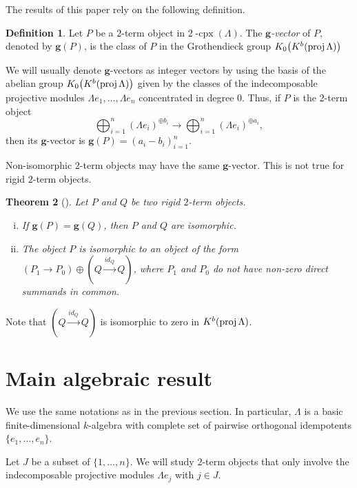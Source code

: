 \documentclass{amsart}
\newtheorem{theorem}{Theorem}%
\theoremstyle{definition}
\newtheorem{definition}[theorem]{Definition}
\renewcommand{\b}[1]{\mathbf{#1}} %
\newcommand{\darkblue}{\color{darkblue}} %
\newcommand{\defn}[1]{\textsl{\darkblue #1}} %
\newcommand{\cpx}{2 \! \operatorname{-cpx}}
\newcommand{\proj}{\operatorname{{\rm proj }}}
\begin{document}
The results of this paper rely on the following definition.

\begin{definition}
 Let $P$ be a $2$-term object in $\cpx(\Lambda)$. 
 The \defn{$\b{g}$-vector} of $P$, denoted by $\b{g}(P)$, is the class of $P$ in the Grothendieck group $K_0\big(K^b(\proj \Lambda)\big)$
\end{definition}
We will usually denote $\b{g}$-vectors as integer vectors by using the basis of the abelian group $K_0\big(K^b(\proj \Lambda)\big)$
given by the classes of the indecomposable projective modules $\Lambda e_1, \dots, \Lambda e_n$ concentrated in degree $0$.
Thus, if $P$ is the $2$-term object
\[
 \bigoplus_{i=1}^n (\Lambda e_i)^{\oplus b_i} \xrightarrow{} \bigoplus_{i=1}^n (\Lambda e_i)^{\oplus a_i},
\]
then its $\b{g}$-vector is $\b{g}(P) = (a_i - b_i)_{i=1}^n$.

Non-isomorphic $2$-term objects may have the same $\b{g}$-vector.  This is not true for rigid $2$-term objects.

\begin{theorem}[{\cite[Sec.~2.3 \& 2.4]{DehyKeller}}]
Let $P$ and $Q$ be two rigid $2$-term objects. 
\begin{enumerate}[(i)]
  \item If ${\b{g}(P) = \b{g}(Q)}$, then $P$ and $Q$ are isomorphic.
  
  \item The object $P$ is isomorphic to an object of the form $(P_1\to P_0) \oplus (Q\stackrel{id_Q}{\to} Q)$,
    where $P_1$ and $P_0$ do not have non-zero direct summands in common.
 \end{enumerate}
\end{theorem}
Note that $(Q\stackrel{id_Q}{\to} Q)$ is isomorphic to zero in $K^b(\proj \Lambda)$.


\section{Main algebraic result}

We use the same notations as in the previous section.  In particular, $\Lambda$ is a basic finite-dimensional $k$-algebra
with complete set of pairwise orthogonal idempotents $\{e_1, \dots, e_n\}$.

Let $J$ be a subset of $\{1, \dots, n\}$.  
We will study $2$-term objects that only involve the indecomposable projective modules $\Lambda e_j$ with $j\in J$.
\end{document}
